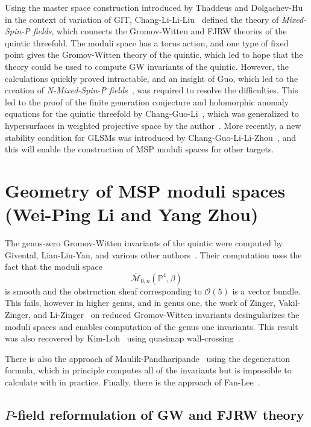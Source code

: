 \documentclass[10pt]{amsart}
\theoremstyle{definition}
\theoremstyle{remark}
\theoremstyle{plain}
\theoremstyle{definition}
\theoremstyle{remark}
\renewcommand{\P}{\mathbb{P}}
\newcommand{\Mbar}{\overline{\mathcal{M}}}
\newcommand{\mc}[1]{\mathcal{#1}}
\newcommand{\1}{\mathbf{1}}
\newcommand{\2}{\mathbf{2}}
\newcommand{\3}{\mathbf{3}}
\begin{document}
Using the master space construction introduced by Thaddeus and Dolgachev-Hu~\cite{gitflips,dhgit} in the context of variation of GIT, Chang-Li-Li-Liu~\cite{mspfermat,msp2} defined the theory of \textit{Mixed-Spin-P fields}, which connects the Gromov-Witten and FJRW theories of the quintic threefold. The moduli space has a torus action, and one type of fixed point gives the Gromov-Witten theory of the quintic, which led to hope that the theory could be used to compute GW invariants of the quintic. However, the calculations quickly proved intractable, and an insight of Guo, which led to the creation of \textit{N-Mixed-Spin-P fields}~\cite{nmsp}, was required to resolve the difficulties. This led to the proof of the finite generation conjecture and holomorphic anomaly equations for the quintic threefold by Chang-Guo-Li~\cite{nmsp2,nmsp3}, which was generalized to hypersurfaces in weighted projective space by the author~\cite{polynomiality,bcovme}. More recently, a new stability condition for GLSMs was introduced by Chang-Guo-Li-Li-Zhou~\cite{generalmsp}, and this will enable the construction of MSP moduli spaces for other targets.

\section{Geometry of MSP moduli spaces (Wei-Ping Li and Yang Zhou)}%
\label{sec:Prehistory}

The genus-zero Gromov-Witten invariants of the quintic were computed by Givental, Lian-Liu-Yau, and various other authors~\cite{eqgwinv,lly}. Their computation uses the fact that the moduli space
\[ \Mbar_{0,n}(\P^4, \beta) \]
is smooth and the obstruction sheaf corresponding to $\mc{O}(5)$ is a vector bundle. This fails, however in higher genus, and in genus one, the work of Zinger, Vakil-Zinger, and Li-Zinger~\cite{reducedgenus1,desingularizationgenusone,g1cilizinger} on reduced Gromov-Witten invariants desingularizes the moduli spaces and enables computation of the genus one invariants. This result was also recovered by Kim-Loh~\cite{kimlho} using quasimap wall-crossing~\cite{qmapwcms,qmapwc}.

There is also the approach of Maulik-Pandharipande~\cite{topviewofgw} using the degeneration formula, which in principle computes all of the invariants but is impossible to calculate with in practice. Finally, there is the approach of Fan-Lee~\cite{fanlee}.

\subsection{$P$-field reformulation of GW and FJRW theory}
\label{sub:P fields}
\end{document}
